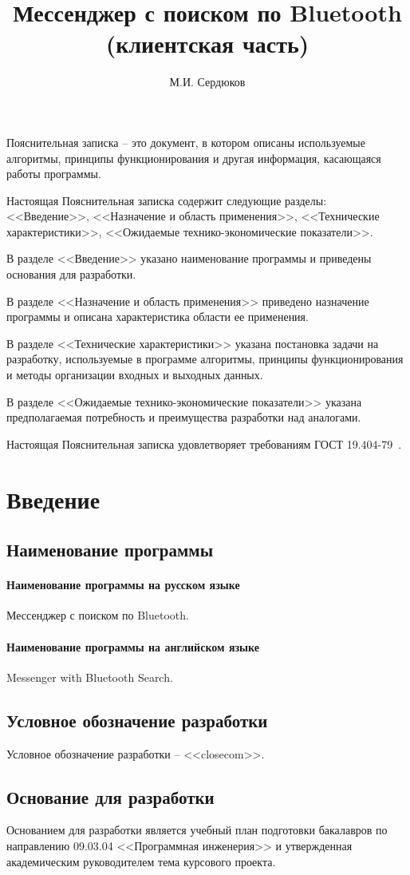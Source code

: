 \documentclass[explnote]{espd}
\author{М.И. Сердюков}
\title{Мессенджер с поиском по Bluetooth\\(клиентская часть)}
\begin{document}
\annotation
Пояснительная записка -- это документ, в котором описаны используемые алгоритмы, принципы функционирования и другая информация, касающаяся работы программы.

Настоящая Пояснительная записка содержит следующие разделы: <<Введение>>, <<Назначение и область применения>>, <<Технические характеристики>>, <<Ожидаемые технико-экономические показатели>>.

В разделе <<Введение>> указано наименование программы и приведены основания для разработки.

В разделе <<Назначение и область применения>> приведено назначение программы и описана характеристика области ее применения.

В разделе <<Технические характеристики>> указана постановка задачи на разработку, используемые в программе алгоритмы, принципы функционирования и методы организации входных и выходных данных.

В разделе <<Ожидаемые технико-экономические показатели>> указана предполагаемая потребность и преимущества разработки над аналогами.

Настоящая Пояснительная записка удовлетворяет требованиям ГОСТ 19.404-79~\cite{espd404}.

\tableofcontents

\section{Введение}
\subsection{Наименование программы}
\paragraph{Наименование программы на русском языке}
Мессенджер с поиском по Bluetooth.
\paragraph{Наименование программы на английском языке}
Messenger with Bluetooth Search.

\subsection{Условное обозначение разработки}
Условное обозначение разработки -- <<closecom>>.

\subsection{Основание для разработки}
Основанием для разработки является учебный план подготовки бакалавров по направлению 09.03.04 <<Программная инженерия>> и утвержденная академическим руководителем тема курсового проекта.
\end{document}
